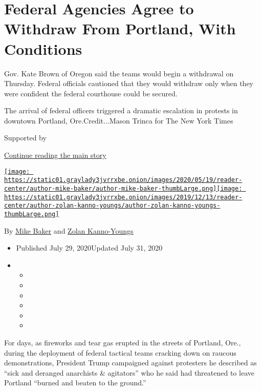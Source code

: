 \hypertarget{federal-agencies-agree-to-withdraw-from-portland-with-conditions}{%
\section{Federal Agencies Agree to Withdraw From Portland, With
Conditions}\label{federal-agencies-agree-to-withdraw-from-portland-with-conditions}}

Gov. Kate Brown of Oregon said the teams would begin a withdrawal on
Thursday. Federal officials cautioned that they would withdraw only when
they were confident the federal courthouse could be secured.

The arrival of federal officers triggered a dramatic escalation in
protests in downtown Portland, Ore.Credit...Mason Trinca for The New
York Times

Supported by

\protect\hyperlink{after-sponsor}{Continue reading the main story}

\href{https://www.nytimes3xbfgragh.onion/by/mike-baker}{\texttt{[image: https://static01.graylady3jvrrxbe.onion/images/2020/05/19/reader-center/author-mike-baker/author-mike-baker-thumbLarge.png]}}\href{https://www.nytimes3xbfgragh.onion/by/zolan-kanno-youngs}{\texttt{[image: https://static01.graylady3jvrrxbe.onion/images/2019/12/13/reader-center/author-zolan-kanno-youngs/author-zolan-kanno-youngs-thumbLarge.png]}}

By \href{https://www.nytimes3xbfgragh.onion/by/mike-baker}{Mike Baker}
and
\href{https://www.nytimes3xbfgragh.onion/by/zolan-kanno-youngs}{Zolan
Kanno-Youngs}

\begin{itemize}
\item
  Published July 29, 2020Updated July 31, 2020
\item
  \begin{itemize}
  \item
  \item
  \item
  \item
  \item
  \item
  \end{itemize}
\end{itemize}

For days, as fireworks and tear gas erupted in the streets of Portland,
Ore., during the deployment of federal tactical teams cracking down on
raucous demonstrations, President Trump campaigned against protesters he
described as ``sick and deranged anarchists \& agitators'' who he said
had threatened to leave Portland ``burned and beaten to the ground.''

